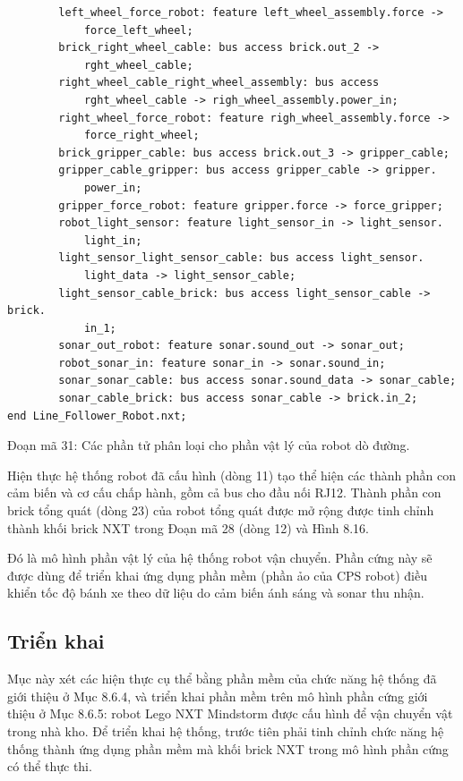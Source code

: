 \begin{verbatim}
        left_wheel_force_robot: feature left_wheel_assembly.force ->
            force_left_wheel;
        brick_right_wheel_cable: bus access brick.out_2 ->
            rght_wheel_cable;
        right_wheel_cable_right_wheel_assembly: bus access
            rght_wheel_cable -> righ_wheel_assembly.power_in;
        right_wheel_force_robot: feature righ_wheel_assembly.force ->
            force_right_wheel;
        brick_gripper_cable: bus access brick.out_3 -> gripper_cable;
        gripper_cable_gripper: bus access gripper_cable -> gripper.
            power_in;
        gripper_force_robot: feature gripper.force -> force_gripper;
        robot_light_sensor: feature light_sensor_in -> light_sensor.
            light_in;
        light_sensor_light_sensor_cable: bus access light_sensor.
            light_data -> light_sensor_cable;
        light_sensor_cable_brick: bus access light_sensor_cable -> brick.
            in_1;
        sonar_out_robot: feature sonar.sound_out -> sonar_out;
        robot_sonar_in: feature sonar_in -> sonar.sound_in;
        sonar_sonar_cable: bus access sonar.sound_data -> sonar_cable;
        sonar_cable_brick: bus access sonar_cable -> brick.in_2;
end Line_Follower_Robot.nxt;
\end{verbatim}
\begin{center}\small Đoạn mã 31: Các phần tử phân loại cho phần vật lý của robot dò đường.\end{center}

Hiện thực hệ thống robot đã cấu hình (dòng 11) tạo thể hiện các thành phần con cảm biến và cơ cấu chấp hành, gồm cả bus cho đầu nối RJ12. Thành phần con brick tổng quát (dòng 23) của robot tổng quát được mở rộng được tinh chỉnh thành khối brick NXT trong Đoạn mã 28 (dòng 12) và Hình 8.16.

Đó là mô hình phần vật lý của hệ thống robot vận chuyển. Phần cứng này sẽ được dùng để triển khai ứng dụng phần mềm (phần ảo của CPS robot) điều khiển tốc độ bánh xe theo dữ liệu do cảm biến ánh sáng và sonar thu nhận.

\subsection{Triển khai}
Mục này xét các hiện thực cụ thể bằng phần mềm của chức năng hệ thống đã giới thiệu ở Mục 8.6.4, và triển khai phần mềm trên mô hình phần cứng giới thiệu ở Mục 8.6.5: robot Lego NXT Mindstorm được cấu hình để vận chuyển vật trong nhà kho. Để triển khai hệ thống, trước tiên phải tinh chỉnh chức năng hệ thống thành ứng dụng phần mềm mà khối brick NXT trong mô hình phần cứng có thể thực thi.

